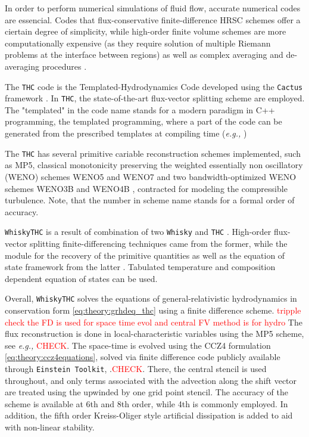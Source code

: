 \documentclass[11pt,a4paper,headinclude=true,DIV=14,BCOR=8mm,chapterprefix,listof=totoc,twoside,openright,abstracton]{scrbook}
\newcommand{\red}[1]{\textcolor{red}{#1}}
\begin{document}
In order to perform numerical simulations of fluid flow, accurate numerical codes are essencial. Codes that flux-conservative finite-difference HRSC schemes offer a ciertain degree of simplicity, while high-order finite volume schemes are more computationally expensive (as they require solution of multiple Riemann problems at the interface between regions) \cite{Reisswig:2009us,Shu:2001rep} as well as complex averaging and de-averaging procedures \cite{Tchekhovskoy:2007zn}.

The \texttt{THC} code is the Templated-Hydrodynamics Code developed using the \texttt{Cactus} framework \cite{Goodale:2003}. In \texttt{THC}, the state-of-the-art flux-vector splitting scheme are employed. The "templated" in the code name stands for a modern paradigm in C++ programming, the templated programming, where a part of the code can be generated from the prescribed templates at compiling time (\textit{e.g.,} \cite{Yang:2001})

The \texttt{THC} has several primitive cariable reconstruction schemes implemented, such as MP5, classical monotonicity preserving \cite{Suresh:1997,Mignone:2010} the weighted essentially non oscillatory (WENO) schemes WENO5 and WENO7 \cite{Liu:1994,Jiang:1996,Shu:1997} and two bandwidth-optimized WENO schemes WENO3B and WENO4B \cite{Martin:2006,Taylor:2007}, contracted for modeling the compressible turbulence. Note, that the number in scheme name stands for a formal order of accuracy.

\texttt{WhiskyTHC} is a result of combination of two \texttt{Whisky} \cite{Baiotti:2004wn} and \texttt{THC} \cite{Radice:2012cu}. High-order flux-vector splitting finite-differencing techniques came from the former, while the module for the recovery of the primitive quantities as well as the equation of state framework from the latter \cite{Galeazzi:2013mia}. Tabulated temperature and composition dependent equation of states can be used.

Overall, \texttt{WhiskyTHC} solves the equations of general-relativistic hydrodynamics in conservation form \ref{eq:theory:grhdeq_thc} using a finite difference scheme. \red{tripple check the FD is used for space time evol and central FV method is for hydro}
The flux reconstruction is done in local-characteristic variables using the MP5 scheme, see \textit{e.g.,} \cite{Rezzolla:2013} \red{CHECK}.
The space-time is evolved using the CCZ4 formulation \ref{eq:theory:ccz4equations}, solved via finite difference code publicly available through \texttt{Einstein Toolkit}, \cite{McLachlan,Loffler:2011ay}.\red{CHECK}.
There, the central stencil is used throughout, and only terms associated with the advection along the shift vector are treated using the upwinded by one grid point stencil. The accuracy of the scheme is available at 6th and 8th order, while 4th is commonly employed. In addition, the fifth order Kreiss-Oliger style artificial dissipation \cite{Kreiss:1973} is added to aid with non-linear stability.
\end{document}
